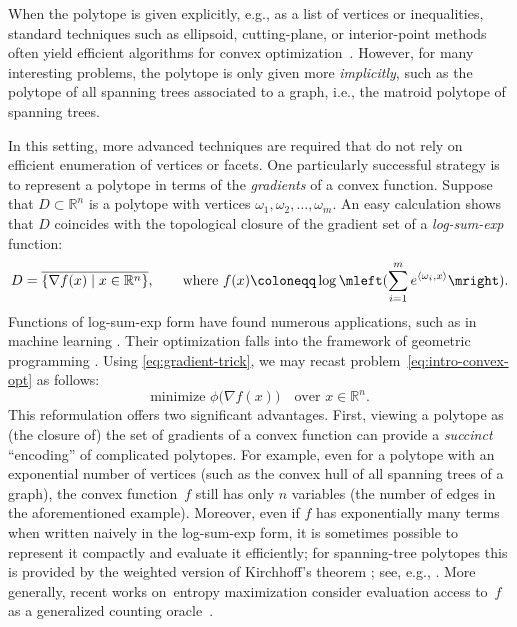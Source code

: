 \documentclass[11pt,letterpaper]{article}
\numberwithin{equation}{section}
\newcommand{\RR}{\mathbb{R}}
\newcommand{\minproblem}[2]{\text{minimize } #1 \quad \text{over } #2}
\begin{document}
When the polytope is given explicitly, e.g., as a list of vertices or inequalities, standard techniques such as ellipsoid, cutting-plane, or interior-point methods often yield efficient algorithms for convex optimization~\cite{kelley1960cutting,Khachiyan79,Khachiyan80,Renegar-book}.
However, for many interesting problems, the polytope is only given more \emph{implicitly}, such as the polytope of all spanning trees associated to a graph, i.e., the matroid polytope of spanning trees.

In this setting, more advanced techniques are required that do not rely on efficient enumeration of vertices or facets.
One particularly successful strategy is to represent a polytope in terms of the \emph{gradients} of a convex function.
Suppose that $D\subset\RR^n$ is a polytope with vertices $\omega_1,\omega_2,\dots,\omega_m$.
An easy calculation shows that $D$ coincides with the topological closure of the gradient set of a \emph{log-sum-exp} function:
\begin{equation}\label{eq:gradient-trick}
    D = \overline{\{\nabla f(x) \mid x\in\RR^n\}}, \qquad \text{where } f(x) \coloneqq \log\mleft( \sum_{i=1}^m e^{\langle \omega_i,x\rangle} \mright).
\end{equation}
Functions of log-sum-exp form have found numerous applications, such as in machine learning \cite{ml-lse-3,ml-lse-1,ml-lse-2}.
Their optimization falls into the framework of geometric programming \cite{geomet-tut}.
Using \cref{eq:gradient-trick}, we may recast problem~\eqref{eq:intro-convex-opt} as follows:
\begin{equation}\label{eq:gradient-opt}
    \minproblem{\phi\bigl(\nabla f(x) \bigr)}{x \in \RR^n}.
\end{equation}
This reformulation offers two significant advantages.
First, viewing a polytope as (the closure of) the set of gradients of a convex function can provide a \emph{succinct} ``encoding'' of complicated polytopes.
For example, even for a polytope with an exponential number of vertices (such as the convex hull of all spanning trees of a graph), the convex function~$f$ still has only $n$ variables (the number of edges in the aforementioned example).
Moreover, even if $f$ has exponentially many terms when written naively in the log-sum-exp form, it is sometimes possible to represent it compactly and evaluate it efficiently;
for spanning-tree polytopes this is provided by the weighted version of Kirchhoff's theorem \cite{Bollobas-02}; see, e.g., \cite{AGMGS-10}.
More generally, recent works on~entropy maximization consider evaluation access to~$f$ as a generalized counting oracle~\cite{vishnoi-singh,vishnoi-straszak}.
\end{document}
